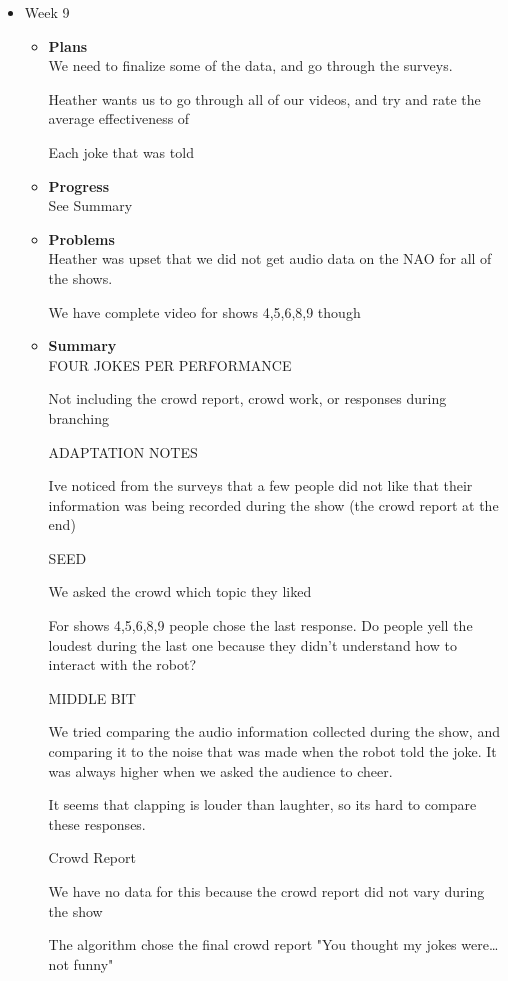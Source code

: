 \begin{itemize}
		\item{Week 9}
			\begin{itemize}
				\item \textbf{Plans} \\
					We need to finalize some of the data, and go through the surveys. 

					Heather wants us to go through all of our videos, and try and rate the average effectiveness of  

					Each joke that was told 
				\item \textbf{Progress} \\
					See Summary
				\item \textbf{Problems} \\
					Heather was upset that we did not get audio data on the NAO for all of the shows.  

					We have complete video for shows 4,5,6,8,9 though
				\item \textbf{Summary} \\
					FOUR JOKES PER PERFORMANCE 

					    Not including the crowd report, crowd work, or responses during branching 


						 ADAPTATION NOTES  

						     Ive noticed from the surveys that a few people did not like that their information was being recorded during the show (the crowd report at the end) 

							      SEED 

									We asked the crowd which topic they liked 

			 For shows 4,5,6,8,9 people chose the last response. Do people yell the loudest during the last one because they didn’t understand how to interact with the robot? 

								MIDDLE BIT 

						We tried comparing the audio information collected during the show, and comparing it to the noise that was made when the robot told the joke. It was always higher when we asked the audience to cheer. 

								It seems that clapping is louder than laughter, so its hard to compare these responses. 

								Crowd Report 

							 We have no data for this because the crowd report did not vary during the show 

							The algorithm chose the final crowd report "You thought my jokes were… not funny"  


\end{itemize}
\end{itemize}
